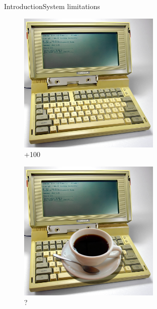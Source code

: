 \begin{frame}{Introduction}{System limitations}
\begin{figure}[ht]
\begin{minipage}[b]{0.26\linewidth}
\includegraphics[width=\textwidth]{img/introduction/laptop.png}
\\{\color{green}+100}
\end{minipage}
\hfill
\begin{minipage}[b]{0.26\linewidth}
\centering
\includegraphics[width=\textwidth]{img/introduction/coffee_on_laptop.png}
\\?
\end{minipage}
\end{figure}

\end{frame}

